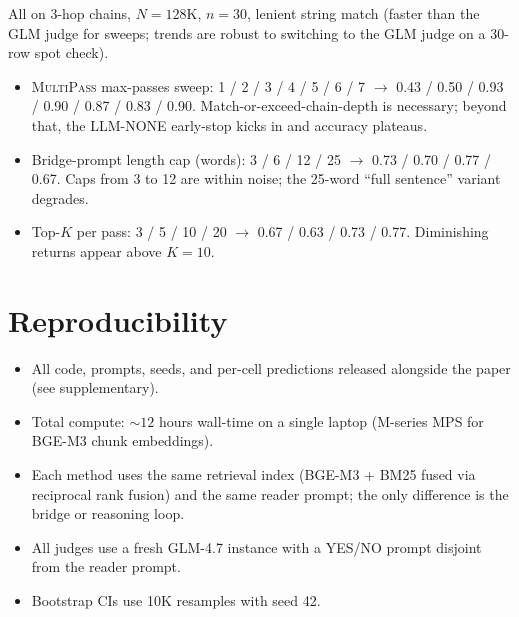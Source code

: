 \documentclass{article}
\theoremstyle{plain}
\theoremstyle{definition}
\newcommand{\ours}{\textsc{MultiPass}}
\begin{document}
All on 3-hop chains, $N{=}128$K, $n{=}30$, lenient string match (faster
than the GLM judge for sweeps; trends are robust to switching to the GLM
judge on a 30-row spot check).

\begin{itemize}\setlength{\itemsep}{0.05em}
  \item \ours{} max-passes sweep: 1 / 2 / 3 / 4 / 5 / 6 / 7
        $\to$ 0.43 / 0.50 / 0.93 / 0.90 / 0.87 / 0.83 / 0.90.
        Match-or-exceed-chain-depth is necessary; beyond that, the
        LLM-NONE early-stop kicks in and accuracy plateaus.
  \item Bridge-prompt length cap (words): 3 / 6 / 12 / 25
        $\to$ 0.73 / 0.70 / 0.77 / 0.67. Caps from 3 to 12 are within
        noise; the 25-word ``full sentence'' variant degrades.
  \item Top-$K$ per pass: 3 / 5 / 10 / 20
        $\to$ 0.67 / 0.63 / 0.73 / 0.77. Diminishing returns appear above
        $K{=}10$.
\end{itemize}

\section{Reproducibility}\label{appx:repro}

\begin{itemize}\setlength{\itemsep}{0.05em}
  \item All code, prompts, seeds, and per-cell predictions released
        alongside the paper (see supplementary).
  \item Total compute: ${\sim}12$ hours wall-time on a single laptop
        (M-series MPS for BGE-M3 chunk embeddings).
  \item Each method uses the same retrieval index (BGE-M3 + BM25 fused
        via reciprocal rank fusion) and the same reader prompt; the
        only difference is the bridge or reasoning loop.
  \item All judges use a fresh GLM-4.7 instance with a YES/NO prompt
        disjoint from the reader prompt.
  \item Bootstrap CIs use 10K resamples with seed 42.
\end{itemize}
\end{document}
